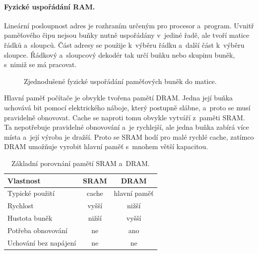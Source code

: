 \paragraph{Fyzické uspořádání RAM.}

Lineární posloupnost adres je rozhraním určeným pro procesor a~program. Uvnitř paměťového čipu nejsou buňky nutně uspořádány v~jediné řadě, ale tvoří matice řádků a~sloupců. Část adresy se použije k~výběru řádku a~další část k~výběru sloupce. Řádkový a~sloupcový dekodér tak určí buňku nebo skupinu buněk, s~nimiž se má pracovat.

\begin{figure}[ht]
    \centering
    
    \caption{Zjednodušené fyzické uspořádání paměťových buněk do matice.}
    \label{fig:hw-ram-matice}
\end{figure}

Hlavní paměť počítače je obvykle tvořena pamětí DRAM. Jedna její buňka uchovává bit pomocí elektrického náboje, který postupně slábne, a~proto se musí pravidelně obnovovat. Cache se naproti tomu obvykle vytváří z~paměti SRAM. Ta nepotřebuje pravidelné obnovování a~je rychlejší, ale jedna buňka zabírá více místa a~její výroba je dražší. Proto se SRAM hodí pro malé rychlé cache, zatímco DRAM umožňuje vyrobit hlavní paměť s~mnohem větší kapacitou.

\begin{table}[ht]
    \centering
    \begin{tabular}{|l|c|c|}
        \hline
        \textbf{Vlastnost} & \textbf{SRAM} & \textbf{DRAM} \\ \hline
        Typické použití & cache & hlavní paměť \\ \hline
        Rychlost & vyšší & nižší \\ \hline
        Hustota buněk & nižší & vyšší \\ \hline
        Potřeba obnovování & ne & ano \\ \hline
        Uchování bez napájení & ne & ne \\ \hline
    \end{tabular}
    \caption{Základní porovnání pamětí SRAM a~DRAM.}
    \label{tab:hw-sram-dram}
\end{table}


